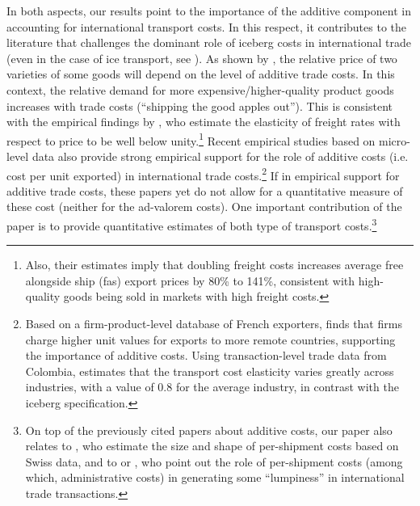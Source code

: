 \documentclass[a4paper,11pt]{article}
\begin{document}
\smallskip
In both aspects, our results point to the importance of the additive component in accounting for international transport costs.
In this respect, it contributes to the literature that challenges the dominant role of iceberg costs in international trade (even in the case of ice transport, see \citealp{bosker2018ice}). As shown by \cite{alchian}, the relative price of two varieties of some goods will depend on the level of additive trade costs. In this context, the relative demand for more expensive/higher-quality product goods increases with trade costs (``shipping the good apples out''). This is consistent with the empirical findings by \cite{hummels_skiba}, who estimate the elasticity of freight rates with respect to price to be well below unity.\footnote{Also, their estimates imply that doubling freight costs increases average free alongside ship (fas) export prices by 80\% to 141\%, consistent with high-quality goods being sold in markets with high freight costs.}
Recent empirical studies based on micro-level data also provide strong empirical support for the role of additive costs (i.e. cost per unit exported) in international trade costs.\footnote{Based on a firm-product-level database of French exporters, \cite{martin2012} finds that firms charge higher unit values for exports to more remote countries, supporting the importance of additive costs.
Using transaction-level trade data from Colombia, \cite{Lashkaripour-2017} estimates that the transport cost elasticity varies greatly across industries, with a value of 0.8 for the average industry, in contrast with the iceberg specification.} If in empirical support for additive trade costs, these papers yet do not allow for a quantitative measure of these cost (neither for the ad-valorem costs). One important contribution of the paper is to provide quantitative estimates of both type of transport costs.\footnote{On top of the previously cited papers about additive costs, our paper also relates to \cite{Kropf-Saure-JIE-2016}, who estimate the size and shape of per-shipment costs based on Swiss data, and to \cite{Alessandria-et-al-AER-2010} or \cite{Hornok-et-al-JIE-2015, Hornok-et-al-RES-2015}, who point out the role of per-shipment costs (among which, administrative costs) in generating some ``lumpiness'' in international trade transactions.} \smallskip
\end{document}
